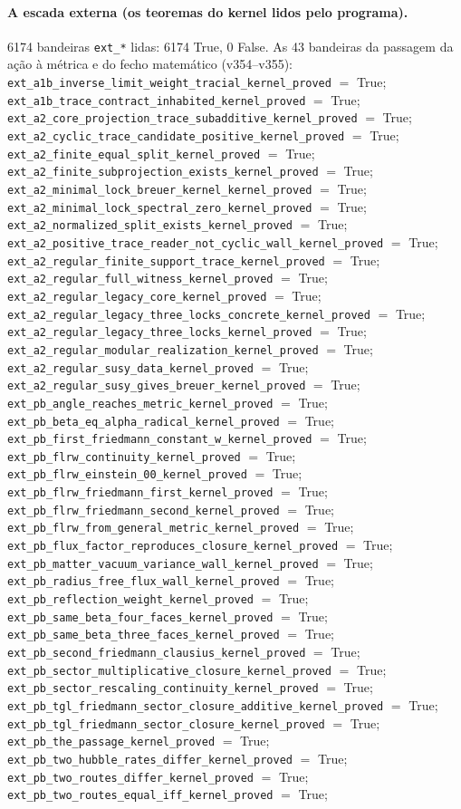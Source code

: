 \documentclass[11pt]{article}
\theoremstyle{definition}\newtheorem{deriv}{Derivação}
\begin{document}
\paragraph*{A escada externa (os teoremas do kernel lidos pelo programa).} 6174 bandeiras \texttt{ext\_*} lidas: 6174 True, 0 False. As 43 bandeiras da passagem da ação à métrica e do fecho matemático (v354--v355): \texttt{ext\_a1b\_inverse\_limit\_weight\_tracial\_kernel\_proved} $=$ True; \texttt{ext\_a1b\_trace\_contract\_inhabited\_kernel\_proved} $=$ True; \texttt{ext\_a2\_core\_projection\_trace\_subadditive\_kernel\_proved} $=$ True; \texttt{ext\_a2\_cyclic\_trace\_candidate\_positive\_kernel\_proved} $=$ True; \texttt{ext\_a2\_finite\_equal\_split\_kernel\_proved} $=$ True; \texttt{ext\_a2\_finite\_subprojection\_exists\_kernel\_proved} $=$ True; \texttt{ext\_a2\_minimal\_lock\_breuer\_kernel\_kernel\_proved} $=$ True; \texttt{ext\_a2\_minimal\_lock\_spectral\_zero\_kernel\_proved} $=$ True; \texttt{ext\_a2\_normalized\_split\_exists\_kernel\_proved} $=$ True; \texttt{ext\_a2\_positive\_trace\_reader\_not\_cyclic\_wall\_kernel\_proved} $=$ True; \texttt{ext\_a2\_regular\_finite\_support\_trace\_kernel\_proved} $=$ True; \texttt{ext\_a2\_regular\_full\_witness\_kernel\_proved} $=$ True; \texttt{ext\_a2\_regular\_legacy\_core\_kernel\_proved} $=$ True; \texttt{ext\_a2\_regular\_legacy\_three\_locks\_concrete\_kernel\_proved} $=$ True; \texttt{ext\_a2\_regular\_legacy\_three\_locks\_kernel\_proved} $=$ True; \texttt{ext\_a2\_regular\_modular\_realization\_kernel\_proved} $=$ True; \texttt{ext\_a2\_regular\_susy\_data\_kernel\_proved} $=$ True; \texttt{ext\_a2\_regular\_susy\_gives\_breuer\_kernel\_proved} $=$ True; \texttt{ext\_pb\_angle\_reaches\_metric\_kernel\_proved} $=$ True; \texttt{ext\_pb\_beta\_eq\_alpha\_radical\_kernel\_proved} $=$ True; \texttt{ext\_pb\_first\_friedmann\_constant\_w\_kernel\_proved} $=$ True; \texttt{ext\_pb\_flrw\_continuity\_kernel\_proved} $=$ True; \texttt{ext\_pb\_flrw\_einstein\_00\_kernel\_proved} $=$ True; \texttt{ext\_pb\_flrw\_friedmann\_first\_kernel\_proved} $=$ True; \texttt{ext\_pb\_flrw\_friedmann\_second\_kernel\_proved} $=$ True; \texttt{ext\_pb\_flrw\_from\_general\_metric\_kernel\_proved} $=$ True; \texttt{ext\_pb\_flux\_factor\_reproduces\_closure\_kernel\_proved} $=$ True; \texttt{ext\_pb\_matter\_vacuum\_variance\_wall\_kernel\_proved} $=$ True; \texttt{ext\_pb\_radius\_free\_flux\_wall\_kernel\_proved} $=$ True; \texttt{ext\_pb\_reflection\_weight\_kernel\_proved} $=$ True; \texttt{ext\_pb\_same\_beta\_four\_faces\_kernel\_proved} $=$ True; \texttt{ext\_pb\_same\_beta\_three\_faces\_kernel\_proved} $=$ True; \texttt{ext\_pb\_second\_friedmann\_clausius\_kernel\_proved} $=$ True; \texttt{ext\_pb\_sector\_multiplicative\_closure\_kernel\_proved} $=$ True; \texttt{ext\_pb\_sector\_rescaling\_continuity\_kernel\_proved} $=$ True; \texttt{ext\_pb\_tgl\_friedmann\_sector\_closure\_additive\_kernel\_proved} $=$ True; \texttt{ext\_pb\_tgl\_friedmann\_sector\_closure\_kernel\_proved} $=$ True; \texttt{ext\_pb\_the\_passage\_kernel\_proved} $=$ True; \texttt{ext\_pb\_two\_hubble\_rates\_differ\_kernel\_proved} $=$ True; \texttt{ext\_pb\_two\_routes\_differ\_kernel\_proved} $=$ True; \texttt{ext\_pb\_two\_routes\_equal\_iff\_kernel\_proved} $=$ True; 
\end{document}
